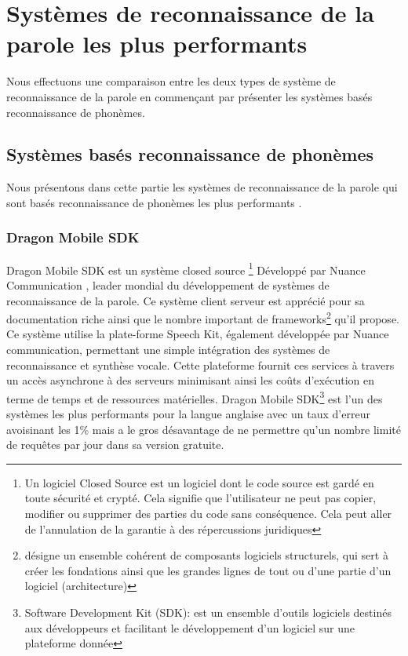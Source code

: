 \section{Systèmes de reconnaissance de la parole les plus performants}
Nous effectuons une comparaison entre les deux types de système de reconnaissance de la parole en commençant par présenter les systèmes basés reconnaissance de phonèmes.

\subsection{Systèmes basés reconnaissance de phonèmes}
Nous présentons dans cette partie les systèmes de reconnaissance de la parole qui sont basés reconnaissance de phonèmes les plus performants \cite{asrreview}.

\subsubsection{Dragon Mobile SDK}
Dragon Mobile SDK est un système closed source \footnote{Un logiciel Closed Source est un logiciel dont le code source est gardé en toute sécurité et crypté. Cela signifie que l'utilisateur ne peut pas copier, modifier ou supprimer des parties du code sans conséquence. Cela peut aller de l'annulation de la garantie à des répercussions juridiques} Développé par Nuance Communication \cite{dragonsdk}, leader mondial du développement de systèmes de reconnaissance de la parole. Ce système client serveur est apprécié pour sa documentation riche ainsi que le nombre important de frameworks\footnote{désigne un ensemble cohérent de composants logiciels structurels, qui sert à créer les fondations ainsi que les grandes lignes de tout ou d'une partie d'un logiciel (architecture)} qu'il propose.
Ce système utilise la plate-forme Speech Kit, également développée par Nuance communication, permettant une simple intégration des systèmes de reconnaissance et synthèse vocale. Cette plateforme fournit ces services à travers un accès asynchrone à des serveurs minimisant ainsi les coûts d'exécution en terme de temps et de ressources matérielles.
Dragon Mobile SDK\footnote{Software Development Kit (SDK): est un ensemble d'outils logiciels destinés aux développeurs et facilitant le développement d'un logiciel sur une plateforme donnée} \cite{dragonsdk} est l'un des systèmes les plus performants pour la langue anglaise avec un taux d'erreur avoisinant les 1\% \cite{asrreview} mais a le gros désavantage de ne permettre qu'un nombre limité de requêtes par jour dans sa version gratuite.


